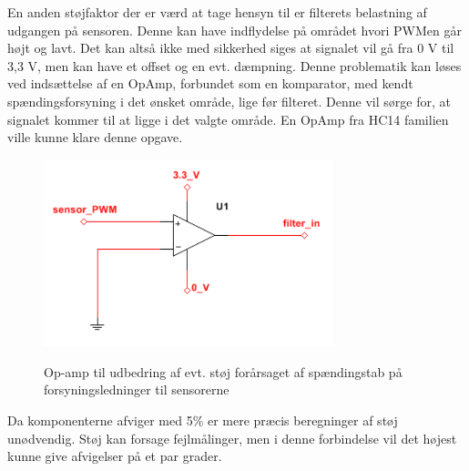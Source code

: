 En anden støjfaktor der er værd at tage hensyn til er filterets belastning af udgangen på sensoren. Denne kan have indflydelse på området hvori PWMen går højt og lavt. Det kan altså ikke med sikkerhed siges at signalet vil gå fra 0 V til 3,3 V, men kan have et offset og en evt. dæmpning. Denne problematik kan løses ved indsættelse af en OpAmp, forbundet som en komparator, med kendt spændingsforsyning i det ønsket område, lige før filteret. Denne vil sørge for, at signalet kommer til at ligge i det valgte område. En OpAmp fra HC14 familien ville kunne klare denne opgave. 

\begin{figure}[htb]
\centering
{\includegraphics[width=0.75\textwidth]{filer/design/Billeder/sht_opamp}}
\caption{Op-amp til udbedring af evt. støj forårsaget af spændingstab på forsyningsledninger til sensorerne}
\label{lab:sht_opamp}
\end{figure}

Da komponenterne afviger med 5\% er mere præcis beregninger af støj unødvendig. Støj kan forsage fejlmålinger, men i denne forbindelse vil det højest kunne give afvigelser på et par grader.